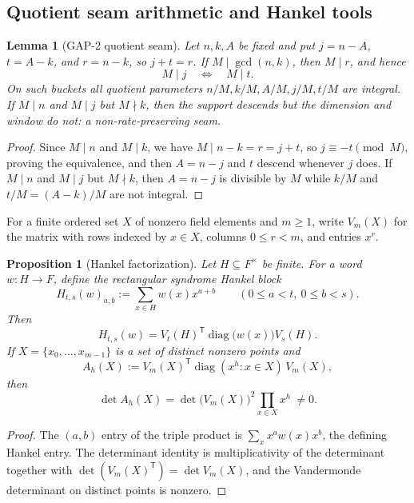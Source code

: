 \documentclass[11pt]{article}
\newtheorem{lemma}[lemma]{Lemma}
\newtheorem{proposition}[proposition]{Proposition}
\theoremstyle{definition}
\theoremstyle{remark}
\begin{document}
\subsection{Quotient seam arithmetic and Hankel tools}

\begin{lemma}[GAP-2 quotient seam]\label{lem:capf-gap2}
Let $n,k,A$ be fixed and put $j=n-A$, $t=A-k$, and $r=n-k$, so $j+t=r$.  If $M\mid\gcd(n,k)$, then $M\mid r$, and hence
\[
        M\mid j \quad\Longleftrightarrow\quad M\mid t.
\]
On such buckets all quotient parameters $n/M,k/M,A/M,j/M,t/M$ are integral.  If $M\mid n$ and $M\mid j$ but $M\nmid k$, then the support descends but the dimension and window do not: a non-rate-preserving seam.
\end{lemma}

\begin{proof}
Since $M\mid n$ and $M\mid k$, we have $M\mid n-k=r=j+t$, so $j\equiv-t\pmod M$, proving the equivalence, and then $A=n-j$ and $t$ descend whenever $j$ does.  If $M\mid n$ and $M\mid j$ but $M\nmid k$, then $A=n-j$ is divisible by $M$ while $k/M$ and $t/M=(A-k)/M$ are not integral.
\end{proof}

For a finite ordered set $X$ of nonzero field elements and $m\ge1$, write $V_m(X)$ for the matrix with rows indexed by $x\in X$, columns $0\le r<m$, and entries $x^r$.

\begin{proposition}[Hankel factorization]\label{prop:capf-hankel}
Let $H\subseteq F^\times$ be finite.  For a word $w:H\to F$, define the rectangular syndrome Hankel block
\[
        H_{t,s}(w)_{a,b}:=\sum_{x\in H}w(x)x^{a+b}
        \qquad(0\le a<t,\ 0\le b<s).
\]
Then
\[
        H_{t,s}(w)=V_t(H)^{\mathsf T}\operatorname{diag}\bigl(w(x)\bigr)V_s(H).
\]
If $X=\{x_0,\ldots,x_{m-1}\}$ is a set of distinct nonzero points and
\[
        A_h(X):=V_m(X)^{\mathsf T}\operatorname{diag}(x^h:x\in X)\,V_m(X),
\]
then
\[
        \det A_h(X)=\det\bigl(V_m(X)\bigr)^2\prod_{x\in X}x^h\ \ne0 .
\]
\end{proposition}

\begin{proof}
The $(a,b)$ entry of the triple product is $\sum_{x}x^aw(x)x^b$, the defining Hankel entry.  The determinant identity is multiplicativity of the determinant together with $\det(V_m(X)^{\mathsf T})=\det V_m(X)$, and the Vandermonde determinant on distinct points is nonzero.
\end{proof}
\end{document}

